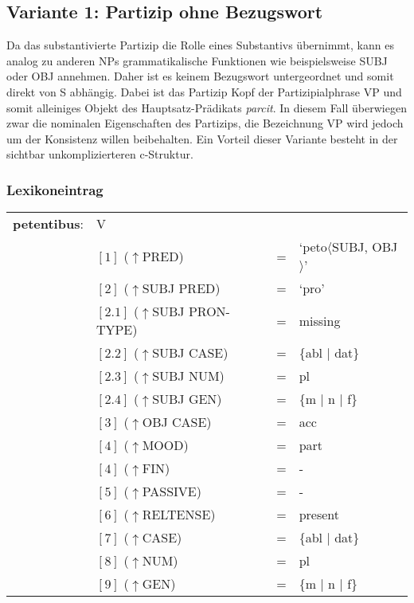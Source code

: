 \documentclass[12pt,a4paper]{article}
\begin{document}
\subsection{Variante 1: Partizip ohne Bezugswort}
Da das substantivierte Partizip die Rolle eines Substantivs übernimmt, kann es analog zu anderen NPs grammatikalische Funktionen wie beispielsweise SUBJ oder OBJ annehmen. Daher ist es keinem Bezugswort untergeordnet und somit direkt von S abhängig. Dabei ist das Partizip Kopf der Partizipialphrase VP und somit alleiniges Objekt des Hauptsatz-Prädikats \textit{parcit}. In diesem Fall überwiegen zwar die nominalen Eigenschaften des Partizips, die Bezeichnung VP wird jedoch um der Konsistenz willen beibehalten. Ein Vorteil dieser Variante besteht in der sichtbar unkomplizierteren c-Struktur.

\subsubsection{Lexikoneintrag}
\begin{singlespace}
\begin{tabular}{ l  l  l  l  } 
\textbf{petentibus}: & V \\
$\qquad$ & $[1]$ \:  ($\uparrow$PRED) & = & `peto$\langle$SUBJ, OBJ$\rangle$' \\
$\qquad$ & $[2]$ \:  ($\uparrow$SUBJ PRED) & = & `pro' \\
$\qquad$ & $[2.1]$ \:  ($\uparrow$SUBJ PRON-TYPE) & = & missing \\
$\qquad$ & $[2.2]$ \:  ($\uparrow$SUBJ CASE) & = & \{abl $\mid$ dat\} \\
$\qquad$ & $[2.3]$ \:  ($\uparrow$SUBJ NUM) & = & pl \\
$\qquad$ & $[2.4]$ \:  ($\uparrow$SUBJ GEN) & = & \{m $\mid$ n $\mid$ f\} \\
$\qquad$ & $[3]$ \:  ($\uparrow$OBJ CASE) & = & acc \\
$\qquad$ & $[4]$ \:  ($\uparrow$MOOD) & = & part\\
$\qquad$ & $[4]$ \:  ($\uparrow$FIN) & = & - \\
$\qquad$ & $[5]$ \:  ($\uparrow$PASSIVE) & = & - \\
$\qquad$ & $[6]$ \:  ($\uparrow$RELTENSE) & = & present \\ 
$\qquad$ & $[7]$ \:  ($\uparrow$CASE) & = & \{abl $\mid$ dat\} \\
$\qquad$ & $[8]$ \:  ($\uparrow$NUM) & = & pl \\
$\qquad$ & $[9]$ \:  ($\uparrow$GEN) & = & \{m $\mid$ n $\mid$ f\} \\
\end{tabular}
\newline
\end{singlespace}
\end{document}
